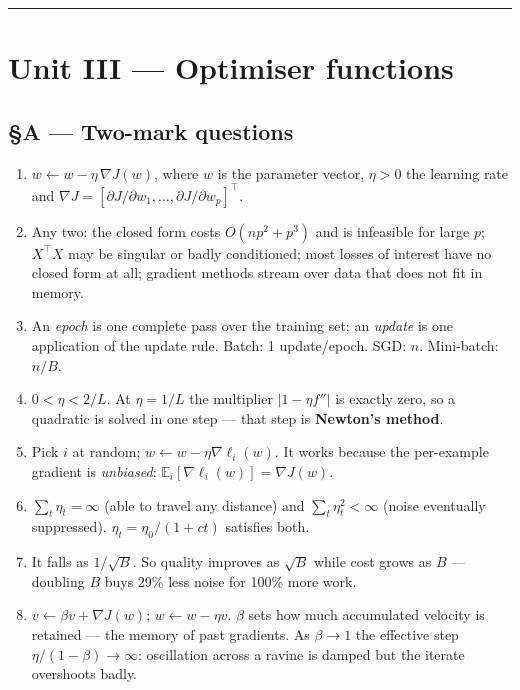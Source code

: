 \documentclass[11pt,a4paper]{article}
\newcommand{\A}[1]{\item[\textbf{#1}]}
\begin{document}
\vspace{0.4em}\hrule

\section*{Unit III --- Optimiser functions}

\subsection*{§A --- Two-mark questions}

\begin{enumerate}[leftmargin=1.9cm]
\A{U3.1} $w \leftarrow w - \eta\,\nabla J(w)$, where $w$ is the parameter
vector, $\eta > 0$ the learning rate and
$\nabla J = [\partial J/\partial w_1, \dots, \partial J/\partial w_p]^\top$.

\A{U3.2} Any two: the closed form costs $O(np^2 + p^3)$ and is infeasible for
large $p$; $X^\top X$ may be singular or badly conditioned; most losses of
interest have no closed form at all; gradient methods stream over data that
does not fit in memory.

\A{U3.3} An \emph{epoch} is one complete pass over the training set; an
\emph{update} is one application of the update rule. Batch: 1 update/epoch.
SGD: $n$. Mini-batch: $n/B$.

\A{U3.4} $0 < \eta < 2/L$. At $\eta = 1/L$ the multiplier $|1 - \eta f''|$ is
exactly zero, so a quadratic is solved in one step --- that step is
\textbf{Newton's method}.

\A{U3.5} Pick $i$ at random; $w \leftarrow w - \eta\nabla\ell_i(w)$. It works
because the per-example gradient is \emph{unbiased}:
$\mathbb E_i[\nabla\ell_i(w)] = \nabla J(w)$.

\A{U3.6} $\sum_t \eta_t = \infty$ (able to travel any distance) and
$\sum_t \eta_t^2 < \infty$ (noise eventually suppressed).
$\eta_t = \eta_0/(1+ct)$ satisfies both.

\A{U3.7} It falls as $1/\sqrt B$. So quality improves as $\sqrt B$ while cost
grows as $B$ --- doubling $B$ buys 29\% less noise for 100\% more work.

\A{U3.8} $v \leftarrow \beta v + \nabla J(w)$; $w \leftarrow w - \eta v$.
$\beta$ sets how much accumulated velocity is retained --- the memory of past
gradients. As $\beta \to 1$ the effective step $\eta/(1-\beta) \to \infty$:
oscillation across a ravine is damped but the iterate overshoots badly.


\end{enumerate}
\end{document}
